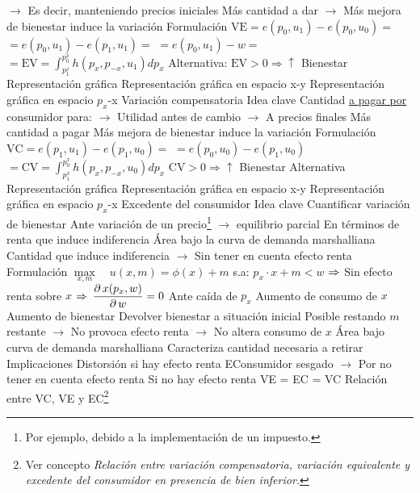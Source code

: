 \documentclass{nuevotema}
\begin{document}
\begin{esquemal}
				\4[] $\to$ Es decir, manteniendo precios iniciales
				\4 Más cantidad a dar
				\4[] $\to$ Más mejora de bienestar induce la variación
			\3 Formulación
				\4 $\text{VE} = e(p_0, u_1) - e(p_0, u_0) = $
				\4[] $= e(p_0, u_1) - e(p_1, u_1) = $
				\4[] $= e(p_0, u_1) - w = $
				\4[] $=\text{EV} = \int_{p^x_1}^{p^x_0} h(p_x, p_{-x}, u_1) dp_x$
				\4 Alternativa:
				\4[] 
				\4 $\text{EV}>0 \Rightarrow \uparrow$ Bienestar
			\3 Representación gráfica
				\4 Representación gráfica en espacio x-y
				\4[] 
				\4 Representación gráfica en espacio $p_x$-x
				\4[] 
		\2 Variación compensatoria
			\3 Idea clave
				\4 Cantidad \underline{a pagar por} consumidor para:
				\4[] $\rightarrow$ Utilidad antes de cambio
				\4[] $\rightarrow$ A precios finales
				\4 Más cantidad a pagar
				\4[$\to$] Más mejora de bienestar induce la variación
			\3 Formulación
				\4[] $\text{VC} = e(p_1, u_1) - e(p_1, u_0) =$
				\4[] $= e(p_0, u_0) - e(p_1, u_0)$
				\4[] $=\text{CV} = \int_{p^x_1}^{p^x_0} h(p_x, p_{-x}, u_0) dp_x$
				\4 $\text{CV}>0 \Rightarrow \uparrow$ Bienestar
				\4 Alternativa
				\4[] 
			\3 Representación gráfica
				\4 Representación gráfica en espacio x-y
				\4[] 
				\4 Representación gráfica en espacio $p_x$-x
				\4[] 
		\2 Excedente del consumidor
			\3 Idea clave
				\4 Cuantificar variación de bienestar
				\4[] Ante variación de un precio\footnote{Por ejemplo, debido a la implementación de un impuesto.} $\to$ equilibrio parcial
				\4[] En términos de renta que induce indiferencia
				\4 Área bajo la curva de demanda marshalliana
				\4[] Cantidad que induce indiferencia
				\4[] $\to$ Sin tener en cuenta efecto renta
				\4
			\3 Formulación
				\4[] $\underset{x,m}{\max} \quad u(x,m) = \phi(x) + m$
				\4[] s.a: $p_x \cdot x + m < w$
				\4[] $\Rightarrow$ Sin efecto renta sobre $x$
				\4[] $\Rightarrow$ $\dfrac{\partial \, x(p_x,w)}{\partial \, w} = 0$
				\4 Ante caída de $p_x$
				\4[] Aumento de consumo de $x$
				\4[] Aumento de bienestar
				\4 Devolver bienestar a situación inicial
				\4[] Posible restando $m$ restante
				\4[] $\to$ No provoca efecto renta
				\4[] $\to$ No altera consumo de $x$
				\4 Área bajo curva de demanda marshalliana
				\4[] Caracteriza cantidad necesaria a retirar
			\3 Implicaciones
				\4 Distorsión si hay efecto renta
				\4[] EConsumidor sesgado
				\4[] $\to$ Por no tener en cuenta efecto renta
				\4 Si no hay efecto renta
				\4[] VE = EC = VC
		\2 Relación entre VC, VE y EC\footnote{Ver concepto \textit{Relación entre variación compensatoria, variación equivalente y excedente del consumidor en presencia de bien inferior.}}

\end{esquemal}
\end{document}
